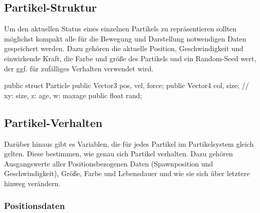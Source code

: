 
\subsection{Partikel-Struktur}
\label{lst:particle}

Um den aktuellen Status eines einzelnen Partikels zu repräsentieren sollten möglichst kompakt alle für die Bewegung und Darstellung notwendigen Daten gespeichert werden. Dazu gehören die aktuelle Position, Geschwindigkeit und einwirkende Kraft, die Farbe und größe des Partikels und ein Random-Seed wert, der ggf. für zufälliges Verhalten verwendet wird.

\begin{csh}
public struct Particle
{
    public Vector3 pos, vel, force;
    public Vector4 col, size; // xy: size,  z: age, w: maxage
    public float rand;
}
\end{csh}


\subsection{Partikel-Verhalten}

Darüber hinaus gibt es Variablen, die für jedes Partikel im Partikelsystem gleich gelten. Diese bestimmen, wie genau sich Partikel verhalten. Dazu gehören Ausgangswerte aller Positionsbezogenen Daten (Spawnposition und Geschwindigkeit), Größe, Farbe und Lebensdauer und wie sie sich über letztere hinweg verändern.






\subsubsection{Positionsdaten}


